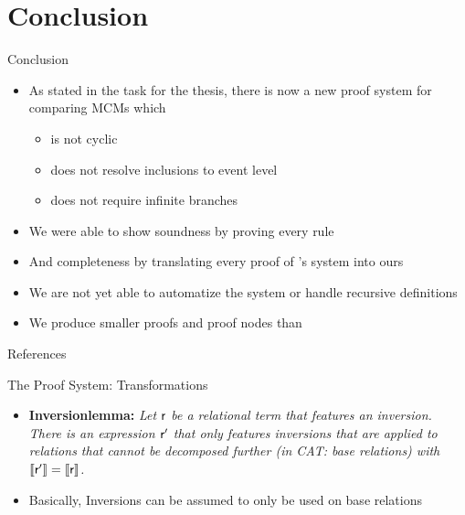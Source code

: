 \documentclass[t,english,aspectratio=169,11pt]{beamer}
\begin{document}
\section{Conclusion}
\begin{frame}{Conclusion}
\begin{itemize}[<+->]
	\item As stated in the task for the thesis, there is now a new proof system for comparing MCMs which
	\begin{itemize}
		\item is not cyclic
		\item does not resolve inclusions to event level
		\item does not require infinite branches
	\end{itemize}
	\item We were able to show soundness by proving every rule
	\item And completeness by translating every proof of \cite{Gru+26}'s system into ours
	\item We are not yet able to automatize the system or handle recursive definitions
	\item We produce smaller proofs and proof nodes than \cite{Gru+26}
\end{itemize}
\end{frame}


\begin{frame}[allowframebreaks]{References}
\renewcommand{\bibfont}{\small}
\printbibliography
\end{frame}

\begin{frame}{The Proof System: Transformations}
\begin{itemize}
	\item {\selectfont \textbf{Inversionlemma:} \textit{Let $\textsf{\upshape r}$ be a relational term that features an inversion. There is an expression $\textsf{\upshape r}'$ that only features inversions that are applied to relations that cannot be decomposed further (in CAT: base relations) with $\llbracket \textsf{\upshape r}' \rrbracket = \llbracket \textsf{\upshape r} \rrbracket$.}}
	\item Basically, Inversions can be assumed to only be used on base relations 
\end{itemize}
\end{frame}
\end{document}
